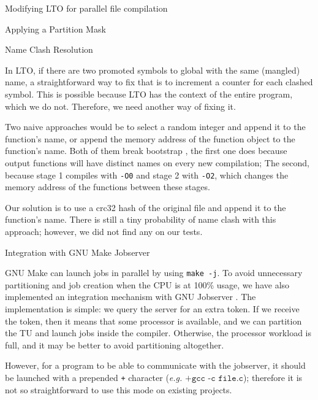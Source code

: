 \begin{section}{Modifying LTO for parallel file compilation}
\begin{subsection}{Applying a Partition Mask}
\end{subsection}

\begin{subsection}{Name Clash Resolution}\label{sec:name_clash_resolution}

In LTO, if there are two promoted symbols to global with the same (mangled) name, a
straightforward way to fix that is to increment a counter for each clashed
symbol. This is possible because LTO has the context of the entire program,
which we do not. Therefore, we need another way of fixing it.

Two naive approaches would be to select a random integer and append it to the
function's name, or append the memory address of the function object to the
function's name.  Both of them break bootstrap \citep{bootstrap}, the first
one does because output functions will have distinct names on every new compilation; The
second, because stage 1 compiles with \texttt{-O0} and stage 2 with
\texttt{-O2}, which changes the memory address of the functions between these stages.

Our solution is to use a crc32 hash of the original file and append it to the
function's name.  There is still a tiny probability of name clash with this
approach; however, we did not find any on our tests.

\end{subsection}

\begin{subsection}{Integration with GNU Make Jobserver}\label{sec:integration_jobserver}

GNU Make can launch jobs in parallel by using \texttt{make -j}.  To
avoid unnecessary partitioning and job creation when the CPU is at 100\% usage,
we have also implemented an integration mechanism with GNU Jobserver
\citep{posixjobserver}.  The implementation is simple: we query the server for
an extra token. If we receive the token, then it means that some processor is
available, and we can partition the TU and launch jobs inside the compiler.
Otherwise, the processor workload is full, and it may be better to avoid
partitioning altogether.

However, for a program to be able to communicate with the jobserver, it should
be launched with a prepended \texttt{+} character (\textit{e.g.} $\texttt{+gcc
-c file.c}$); therefore it is not so straightforward to use this mode on
existing projects.

\end{subsection}


\end{section}
